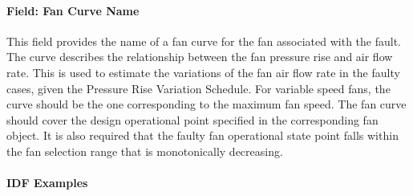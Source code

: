 \paragraph{Field: Fan Curve Name}\label{field-fan-curve-name}

This field provides the name of a fan curve for the fan associated with the fault. The curve describes the relationship between the fan pressure rise and air flow rate. This is used to estimate the variations of the fan air flow rate in the faulty cases, given the Pressure Rise Variation Schedule. For variable speed fans, the curve should be the one corresponding to the maximum fan speed. The fan curve should cover the design operational point specified in the corresponding fan object. It is also required that the faulty fan operational state point falls within the fan selection range that is monotonically decreasing.

\paragraph{IDF Examples}\label{an-example-of-idf-codes-for-the-fouling-air-filter-fault-models}


